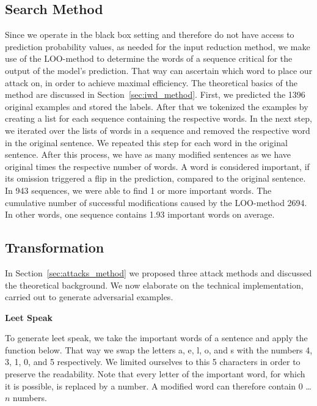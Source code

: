 \subsection{Search Method}
\label{sec:search_method_m}
Since we operate in the black box setting and therefore do not have access to prediction probability values, as needed for the input reduction method, we make use of the LOO-method to determine the words of a sequence critical for the output of the model's prediction. That way can ascertain which word to place our attack on, in order to achieve maximal efficiency. The theoretical basics of the method are discussed in Section~\ref{sec:iwd_method}.
First, we predicted the 1396 original examples and stored the labels. After that we tokenized the examples by creating a list for each sequence containing the respective words. In the next step, we iterated over the lists of words in a sequence and removed the respective word in the original sentence. We repeated this step for each word in the original sentence. 
After this process, we have as many modified sentences as we have original times the respective number of words. A word is considered important, if its omission triggered a flip in the prediction, compared to the original sentence. 
In 943 sequences, we were able to find 1 or more important words. The cumulative number of successful modifications caused by the LOO-method 2694. In other words, one sequence contains 1.93 important words on average.

\subsection{Transformation}
\label{sec:transformation_m}
In Section~\ref{sec:attacks_method} we proposed three attack methods and discussed the theoretical background. We now elaborate on the technical implementation, carried out to generate adversarial examples.

\textbf{Leet Speak}

To generate leet speak, we take the important words of a sentence and apply the function below. That way we swap the letters a, e, l, o, and s with the numbers 4, 3, 1, 0, and 5 respectively. We limited ourselves to this 5 characters in order to preserve the readability. Note that every letter of the important word, for which it is possible, is replaced by a number. A modified word can therefore contain $0$ \dots $n$ numbers.

